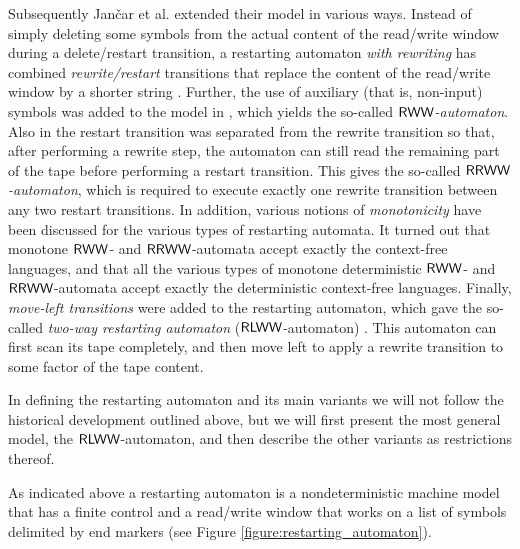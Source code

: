 Subsequently Jan{\v c}ar et al. extended their model in various ways. Instead of simply deleting some symbols from the actual content of the read/write window during a delete/restart transition, a restarting automaton \emph{with rewriting} has combined \emph{rewrite/restart} transitions that replace the content of the read/write window by a shorter string \citep{JMPV97}. Further, the use of auxiliary (that is, non-input) symbols was added to the model in \citep{JMPV98}, which yields the so-called \emph{$\textup{\sf RWW}$-automaton}. Also in \citep{JMPV98} the restart transition was separated from the rewrite transition so that, after performing a rewrite step, the automaton can still read the remaining part of the tape before performing a restart transition. This gives the so-called \emph{$\textup{\sf RRWW}$-automaton}, which is required to execute exactly one rewrite transition between any two restart transitions. In addition, various notions of \emph{monotonicity} have been discussed for the various types of restarting automata. It turned out that monotone $\textup{\sf RWW}$- and $\textup{\sf RRWW}$-automata accept exactly the context-free languages, and that all the various types of monotone deterministic $\textup{\sf RWW}$- and $\textup{\sf RRWW}$-automata accept exactly the deterministic context-free languages. Finally, \emph{move-left transitions} were added to the restarting automaton, which gave the so-called \emph{two-way restarting automaton} ($\textup{\sf RLWW}$-automaton) \citep{P01}. This automaton can first scan its tape completely, and then move left to apply a rewrite transition to some factor of the tape content.

In defining the restarting automaton and its main variants we will not follow the historical development outlined above, but we will first present the most general model, the $\textup{\sf RLWW}$-automaton, and then describe the other variants as restrictions thereof.

As indicated above a restarting automaton is a nondeterministic machine model that has a finite control and a read/write window that works on a list of symbols delimited by end markers (see Figure \ref{figure:restarting_automaton}).


